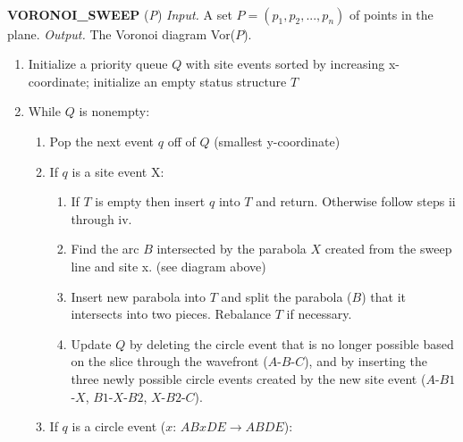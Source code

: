 \documentclass[12pt]{article}
\begin{document}
    \parbox{4.5in}{
    \hrulefill \\
    {\bf VORONOI\_SWEEP} ({\sl P})\newline
    {\sl Input.} A set $P=(p_1,p_2,...,p_n)$ of points in the plane.\newline
    {\sl Output.} The Voronoi diagram Vor($P$).
    \begin{enumerate}

        \item Initialize a priority queue $Q$ with site events sorted by increasing
        x-coordinate; initialize an empty status structure $T$

        \item While $Q$ is nonempty:

        \begin{enumerate}

            \item Pop the next event $q$ off of $Q$ (smallest y-coordinate)

            \item If $q$ is a site event X:

            \begin{enumerate}

                \item If $T$ is empty then insert $q$ into $T$ and return.  Otherwise
                follow steps ii through iv.

                \item Find the arc $B$ intersected by the parabola $X$ created from the 
                sweep line and site x. (see diagram above)

                \item Insert new parabola into $T$ and split the parabola ($B$) that it 
                intersects into two pieces.  Rebalance $T$ if necessary.

                \item Update $Q$ by deleting the circle event that is no longer possible based
                on the slice through the wavefront ($A$-$B$-$C$), and by inserting the three 
                newly possible circle events created by the new site event ($A$-$B1$-$X$, 
                $B1$-$X$-$B2$, $X$-$B2$-$C$).

            \end{enumerate}

        \item If $q$ is a circle event ($x$: $A B x D E \rightarrow A B D E$):


\end{enumerate}
\end{enumerate}}
\end{document}
